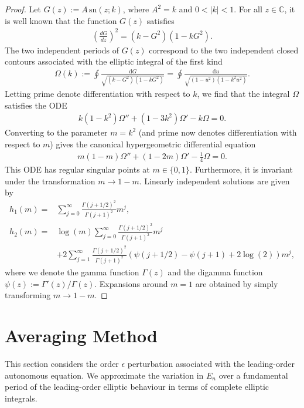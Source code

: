 \documentclass[reqno,a4paper]{amsart}
\numberwithin{equation}{section}
\theoremstyle{plain}
\theoremstyle{remark}
\begin{document}
\begin{proof}
    Let $G(z):=A\,\text{sn}(z;k)$, where $A^2=k$ and $0<|k|<1$. For all $z\in\mathbb{C}$, it is well known that the function $G(z)$ satisfies
    \begin{align*}
        \left(\frac{dG}{dz}\right)^2=\left(k-G^2\right)\left(1-kG^2\right).
    \end{align*}
    The two independent periods of $G(z)$ correspond to the two independent closed contours associated with the elliptic integral of the first kind
    \begin{align*}
        \Omega(k):=\oint\frac{\text{d}G}{\sqrt{(k-G^2)(1-kG^2)}}=\oint\frac{\text{d}u}{\sqrt{(1-u^2)(1-k^2u^2)}}.
    \end{align*}
    Letting prime denote differentiation with respect to $k$, we find that the integral $\Omega$ satisfies the ODE
    \begin{align*}
        k(1-k^2)\Omega''+(1-3k^2)\Omega'-k\Omega=0.
    \end{align*}
    Converting to the parameter $m=k^2$ (and prime now denotes differentiation with respect to $m$) gives the canonical hypergeometric differential equation
    \begin{align*}
        m(1-m)\Omega''+(1-2m)\Omega'-\frac{1}{4}\Omega=0.
    \end{align*}
    This ODE has regular singular points at $m\in\{0,1\}$. Furthermore, it is invariant under the transformation $m\rightarrow1-m$. Linearly independent solutions are given by
    \begin{align*}
        h_1(m)=&\sum_{j=0}^{\infty}\frac{\Gamma(j+1/2)^2}{\Gamma(j+1)^2}m^j,\\
        h_2(m)=&\log(m)\sum_{j=0}^{\infty}\frac{\Gamma(j+1/2)^2}{\Gamma(j+1)^2}m^j\\
        &+2\sum_{j=1}^{\infty}\frac{\Gamma(j+1/2)^2}{\Gamma(j+1)^2}\left(\psi(j+1/2)-\psi(j+1)+2\log(2)\right)m^j,
    \end{align*}
    where we denote the gamma function $\Gamma(z)$ and the digamma function $\psi(z):=\Gamma'(z)/\Gamma(z)$. Expansions around $m=1$ are obtained by simply transforming $m\rightarrow1-m$.
\end{proof}
\section{Averaging Method}\label{sec:averaging}
This section considers the order $\epsilon$ perturbation associated with the leading-order autonomous equation. We approximate the variation in $E_n$ over a fundamental period of the leading-order elliptic behaviour in terms of complete elliptic integrals.
\end{document}
